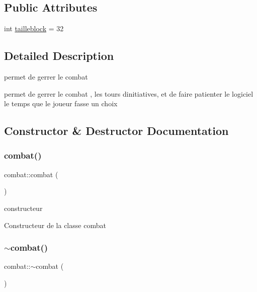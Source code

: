 \subsection*{Public Attributes}
\begin{DoxyCompactItemize}
\item 
int \mbox{\hyperlink{classcombat_ac6d937b74a28b617bab6ed6bb7f581df}{tailleblock}} = 32
\end{DoxyCompactItemize}


\subsection{Detailed Description}
permet de gerrer le combat 

permet de gerrer le combat , les tours d\textquotesingle{}initiatives, et de faire patienter le logiciel le temps que le joueur fasse un choix 

\subsection{Constructor \& Destructor Documentation}
\mbox{\label{classcombat_a24684829bb4a17a24b2716f7ebdc7da1}} 
\subsubsection{\texorpdfstring{combat()}{combat()}}
{\footnotesize\ttfamily combat\+::combat (\begin{DoxyParamCaption}{ }\end{DoxyParamCaption})}



constructeur 

Constructeur de la classe combat \mbox{\label{classcombat_ad44642fc2a369d60b7cb8f8bcd7b86ed}} 
\subsubsection{\texorpdfstring{$\sim$combat()}{~combat()}}
{\footnotesize\ttfamily combat\+::$\sim$combat (\begin{DoxyParamCaption}{ }\end{DoxyParamCaption})}



